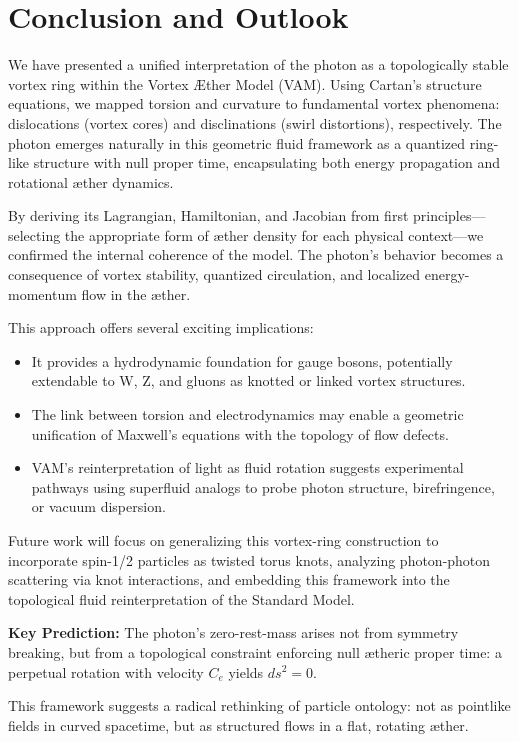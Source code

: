 \section{Conclusion and Outlook}

    We have presented a unified interpretation of the photon as a topologically stable vortex ring within the Vortex \AE ther Model (VAM). Using Cartan’s structure equations, we mapped torsion and curvature to fundamental vortex phenomena: dislocations (vortex cores) and disclinations (swirl distortions), respectively. The photon emerges naturally in this geometric fluid framework as a quantized ring-like structure with null proper time, encapsulating both energy propagation and rotational æther dynamics.


    By deriving its Lagrangian, Hamiltonian, and Jacobian from first principles—selecting the appropriate form of æther density for each physical context—we confirmed the internal coherence of the model. The photon's behavior becomes a consequence of vortex stability, quantized circulation, and localized energy-momentum flow in the æther.


    This approach offers several exciting implications:

    \begin{itemize}

    \item It provides a hydrodynamic foundation for gauge bosons, potentially extendable to W, Z, and gluons as knotted or linked vortex structures.

    \item The link between torsion and electrodynamics may enable a geometric unification of Maxwell’s equations with the topology of flow defects.

    \item VAM’s reinterpretation of light as fluid rotation suggests experimental pathways using superfluid analogs to probe photon structure, birefringence, or vacuum dispersion.

    \end{itemize}


    Future work will focus on generalizing this vortex-ring construction to incorporate spin-1/2 particles as twisted torus knots, analyzing photon-photon scattering via knot interactions, and embedding this framework into the topological fluid reinterpretation of the Standard Model.


    \medskip

    \noindent\textbf{Key Prediction:} The photon's zero-rest-mass arises not from symmetry breaking, but from a topological constraint enforcing null ætheric proper time: a perpetual rotation with velocity $C_e$ yields $ds^2 = 0$.


    \medskip

    \noindent This framework suggests a radical rethinking of particle ontology: not as pointlike fields in curved spacetime, but as structured flows in a flat, rotating æther.